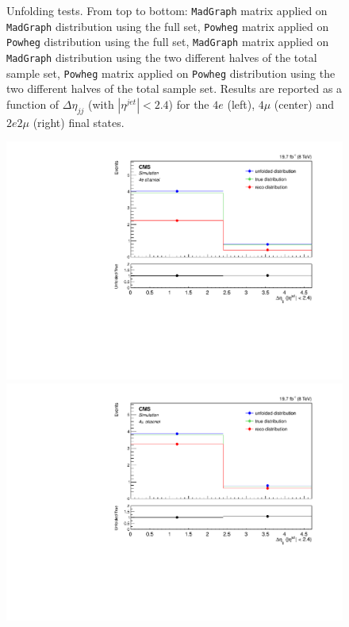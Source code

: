 \begin{figure}[hbtp]
\begin{center}
      \caption{Unfolding tests. From top to bottom: \texttt{MadGraph} matrix applied on \texttt{MadGraph} distribution using the full set, \texttt{Powheg} matrix applied on \texttt{Powheg} distribution using the full set,  \texttt{MadGraph} matrix applied on \texttt{MadGraph} distribution using the two different halves of the total sample set, \texttt{Powheg} matrix applied on \texttt{Powheg} distribution using the two different halves of the total sample set. Results are reported as a function of $\Delta\eta_{jj}$ (with $|\eta^{jet}|<2.4$) for the $4e$ (left), $4\mu$ (center) and $2e2\mu$ (right) final states.}
    \label{fig:MCtest_CentralDeta1}
  \end{center}
\end{figure}

\begin{figure}[hbtp]
  \begin{center}
    \includegraphics[width=0.8\cmsFigWidth]{Figures/Unfolding/MCTests/CentralDeta_ZZTo4e_MadMatrix_PowDistr_FullSample_fr}     
    \includegraphics[width=0.8\cmsFigWidth]{Figures/Unfolding/MCTests/CentralDeta_ZZTo4m_MadMatrix_PowDistr_FullSample_fr}     

\end{center}
\end{figure}
